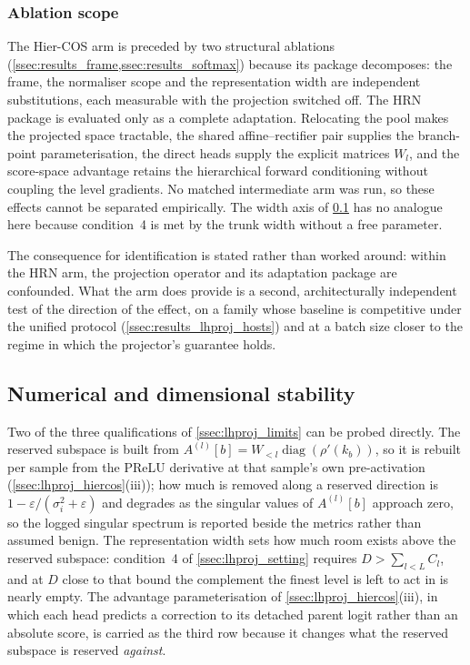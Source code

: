 \subsubsection{Ablation scope}

The Hier-COS arm is preceded by two structural ablations
(\cref{ssec:results_frame,ssec:results_softmax}) because its package decomposes:
the frame, the normaliser scope and the representation width are independent
substitutions, each measurable with the projection switched off. The HRN package
is evaluated only as a complete adaptation. Relocating the pool makes the
projected space tractable, the shared affine--rectifier pair supplies the
branch-point parameterisation, the direct heads supply the explicit matrices
$W_l$, and the score-space advantage retains the hierarchical forward
conditioning without coupling the level gradients. No matched intermediate arm
was run, so these effects cannot be separated empirically. The width axis of
\cref{ssec:results_lhproj_variants} has no analogue here because condition~4 is
met by the trunk width without a free parameter.

The consequence for identification is stated rather than worked around: within
the HRN arm, the projection operator and its adaptation package are
confounded. What the arm does provide is a second, architecturally independent
test of the direction of the effect, on a family whose baseline is competitive
under the unified protocol (\cref{ssec:results_lhproj_hosts}) and at a batch
size closer to the regime in which the projector's guarantee holds.

\subsection{Numerical and dimensional stability}
\label{ssec:results_lhproj_variants}

Two of the three qualifications of \cref{ssec:lhproj_limits} can be probed
directly. The reserved subspace is built from
$A^{(l)}[b]=W_{<l}\operatorname{diag}(\rho'(k_b))$, so it is rebuilt per sample
from the PReLU derivative at that sample's own pre-activation
(\cref{ssec:lhproj_hiercos}(iii)); how much is removed along a reserved
direction is $1-\varepsilon/(\sigma_i^2+\varepsilon)$ and degrades as the
singular values of $A^{(l)}[b]$ approach zero, so the logged singular spectrum
is reported beside the metrics rather than assumed benign. The representation
width sets how much room exists above the reserved subspace: condition~4 of
\cref{ssec:lhproj_setting} requires $D>\sum_{l<L}C_l$, and at $D$ close to that
bound the complement the finest level is left to act in is nearly empty. The
advantage parameterisation of \cref{ssec:lhproj_hiercos}(iii), in which each
head predicts a correction to its detached parent logit rather than an absolute
score, is carried as the third row because it changes what the reserved subspace
is reserved \emph{against}.

